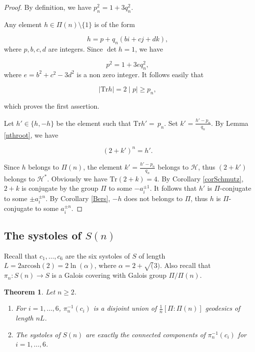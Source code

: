 \documentclass[12pt]{amsart}
\newcommand{\arcosh}{\mathrm{arcosh}}
\newcommand{\Tr}{{\mathrm {Tr}}}
\newtheorem{thm}[lemma]{Theorem}
\newcommand{\cH}{\mathcal{H}}
\begin{document}
\begin{proof} By definition, we have 
$p_n^2=1+3q_n^2$.

Any element $h\in \Pi(n)\setminus\{1\}$ is of the form

$$h=p+q_n (bi+cj+dk),$$ 
where $p, b, c, d$ are integers.
Since $\det h=1$, we have

$$p^2=1+3eq_n^2,$$ 
where $e=b^2+c^2-3d^2$ is a non zero integer. It follows easily that 

$$\mid\Tr h\mid= 2\mid p\mid \geq p_n,$$

which proves the first assertion.

Let $h'\in\{h,-h\}$ be the element such that
$\Tr h'=\,p_n$. Set $k'=\frac{h'-p_n}{q_n}$.
By Lemma \ref{nthroot}, we have

$$(2+k')^n=h'.$$ 

\noindent Since $h$ belongs to $\Pi(n)$, the element
$k'=\frac{h'-p_n}{q_n}$ belongs to $\cH$, thus
$(2+k')$ belongs to $\cH^*$. Obviously
we have $\Tr(2+k)=4$. By Corollary \ref{corSchmutz},
$2+k$ is conjugate by the group $\Pi$ to  
some $-a_i^{\pm1}$. It follows that
$h'$ is $\Pi$-conjugate to some 
$\pm a_i^{\pm n}$. By Corollary \ref{Bers},
 $-h$ does not belongs to $\Pi$, thus 
 $h$ is $\Pi$-conjugate to some 
$a_i^{\pm n}$.
\end{proof}

\subsection{The systoles of $S(n)$}

Recall that $c_1,\ldots, c_6$ are the six systoles of $S$ of length $L=2\arcosh(2)=2\ln(\alpha)$, where
$\alpha=2+\sqrt(3)$.  Also recall that $\pi_n:S(n)\to S$ is a Galois covering with Galois group $\Pi/\Pi(n)$. 

\begin{thm}\label{systolesSn} Let $n\geq 2$.
\begin{enumerate}
\item[(a)] For $i=1,\ldots, 6$,  
$\pi_n^{-1}(c_i)$ is a disjoint union of 
$\frac{1}{n} [\Pi:\Pi(n)]$ geodesics of length
$nL$.
\item[(b)] The systoles of $S(n)$ are exactly the
connected components of $\pi_n^{-1}(c_i)$ for
$i=1,\ldots,6$.
 \end{enumerate}
\end{thm} 
\end{document}
